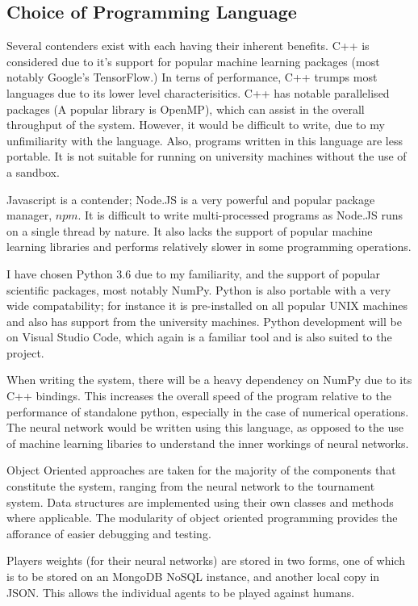 \documentclass[12pt,a4paper]{article}
\begin{document}
\subsection*{Choice of Programming Language}

    Several contenders exist with each having their inherent benefits. C++ is considered due to it's support for popular machine learning packages (most notably Google's TensorFlow.) In terns of performance, C++ trumps most languages due to its lower level characterisitics. C++ has notable parallelised packages (A popular library is OpenMP), which can assist in the overall throughput of the system. However, it would be difficult to write, due to my unfimiliarity with the language. Also, programs written in this language are less portable. It is not suitable for running on university machines without the use of a sandbox.

    Javascript is a contender; Node.JS is a very powerful and popular package manager, $npm$. It is difficult to write multi-processed programs as Node.JS runs on a single thread by nature. It also lacks the support of popular machine learning libraries and performs relatively slower in some programming operations.

    I have chosen Python 3.6 due to my familiarity, and the support of popular scientific packages, most notably NumPy. Python is also portable with a very wide compatability; for instance it is pre-installed on all popular UNIX machines and also has support from the university machines. Python development will be on Visual Studio Code, which again is a familiar tool and is also suited to the project.

    When writing the system, there will be a heavy dependency on NumPy due to its C++ bindings. This increases the overall speed of the program relative to the performance of standalone python, especially in the case of numerical operations. The neural network would be written using this language, as opposed to the use of machine learning libaries to understand the inner workings of neural networks.

    Object Oriented approaches are taken for the majority of the components that constitute the system, ranging from the neural network to the tournament system. Data structures are implemented using their own classes and methods where applicable. The modularity of object oriented programming provides the afforance of easier debugging and testing.

    Players weights (for their neural networks) are stored in two forms, one of which is to be stored on an MongoDB NoSQL instance, and another local copy in JSON. This allows the individual agents to be played against humans.
\end{document}
